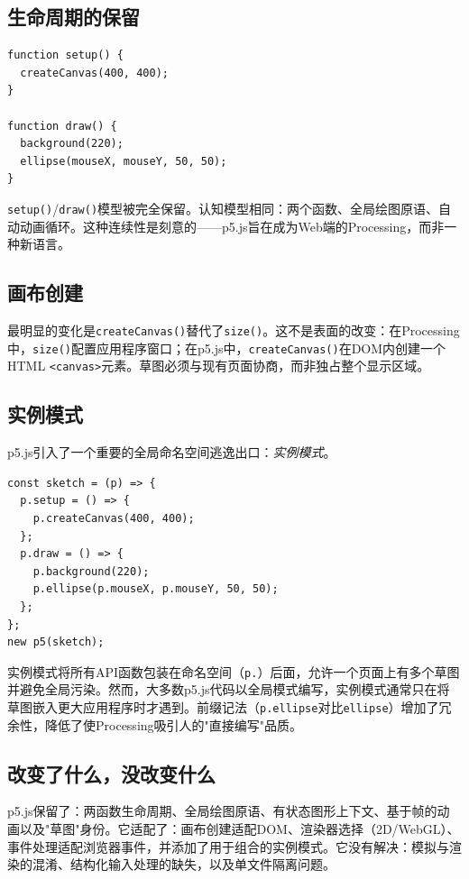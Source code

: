 \documentclass[10pt,letterpaper,twocolumn]{article}
\begin{document}
\subsection{生命周期的保留}

\begin{lstlisting}[style=p5style,caption={最小p5.js草图。}]
function setup() {
  createCanvas(400, 400);
}

function draw() {
  background(220);
  ellipse(mouseX, mouseY, 50, 50);
}
\end{lstlisting}

\texttt{setup()}/\texttt{draw()}模型被完全保留。认知模型相同：两个函数、全局绘图原语、自动动画循环。这种连续性是刻意的——p5.js旨在成为Web端的Processing，而非一种新语言。

\subsection{画布创建}

最明显的变化是\texttt{createCanvas()}替代了\texttt{size()}。这不是表面的改变：在Processing中，\texttt{size()}配置应用程序窗口；在p5.js中，\texttt{createCanvas()}在DOM内创建一个HTML \texttt{<canvas>}元素。草图必须与现有页面协商，而非独占整个显示区域。

\subsection{实例模式}

p5.js引入了一个重要的全局命名空间逃逸出口：\emph{实例模式}。

\begin{lstlisting}[style=p5style,caption={p5.js实例模式。}]
const sketch = (p) => {
  p.setup = () => {
    p.createCanvas(400, 400);
  };
  p.draw = () => {
    p.background(220);
    p.ellipse(p.mouseX, p.mouseY, 50, 50);
  };
};
new p5(sketch);
\end{lstlisting}

实例模式将所有API函数包装在命名空间（\texttt{p.}）后面，允许一个页面上有多个草图并避免全局污染。然而，大多数p5.js代码以全局模式编写，实例模式通常只在将草图嵌入更大应用程序时才遇到。前缀记法（\texttt{p.ellipse}对比\texttt{ellipse}）增加了冗余性，降低了使Processing吸引人的"直接编写"品质。

\subsection{改变了什么，没改变什么}

p5.js保留了：两函数生命周期、全局绘图原语、有状态图形上下文、基于帧的动画以及"草图"身份。它适配了：画布创建适配DOM、渲染器选择（2D/WebGL）、事件处理适配浏览器事件，并添加了用于组合的实例模式。它没有解决：模拟与渲染的混淆、结构化输入处理的缺失，以及单文件隔离问题。
\end{document}
